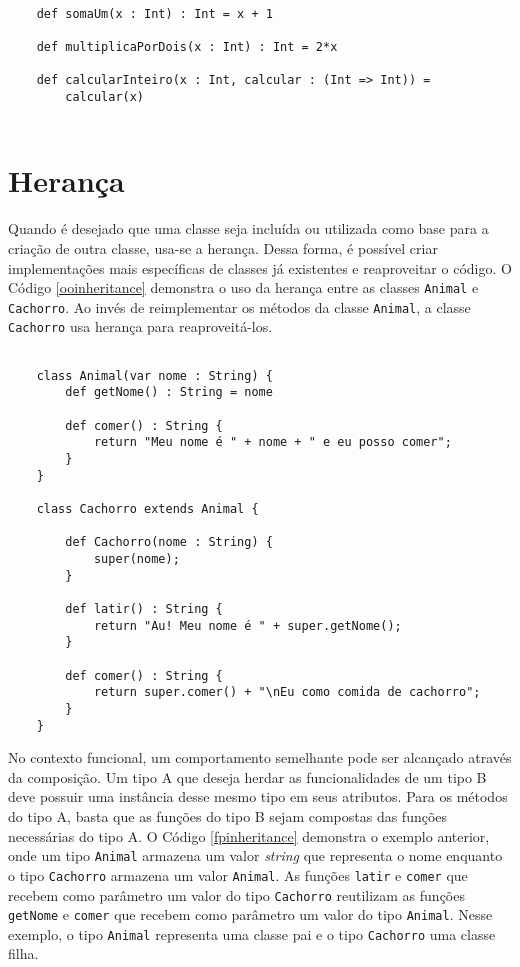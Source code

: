 \begin{lstlisting}[caption={Interfaces em Programação Funcional.},label=fpinterface1]
    
    def somaUm(x : Int) : Int = x + 1

    def multiplicaPorDois(x : Int) : Int = 2*x

    def calcularInteiro(x : Int, calcular : (Int => Int)) =
        calcular(x)
    
\end{lstlisting}



\section{Herança}

Quando é desejado que uma classe seja incluída ou 
utilizada como base para a criação de outra classe, 
usa-se a herança\cite{quarkoo}. Dessa forma, é 
possível criar implementações mais específicas 
de classes já existentes e reaproveitar o código. 
O Código \ref{ooinheritance} demonstra 
o uso da herança entre as classes \texttt{Animal} 
e \texttt{Cachorro}. 
Ao invés de reimplementar os métodos da classe 
\texttt{Animal}, a classe \texttt{Cachorro} usa herança 
para reaproveitá-los. 

\begin{lstlisting}[caption={Herança em Orientação a Objetos.},label=ooinheritance]
    
    class Animal(var nome : String) {
        def getNome() : String = nome
        
        def comer() : String {
            return "Meu nome é " + nome + " e eu posso comer";
        }
    }

    class Cachorro extends Animal {
        
        def Cachorro(nome : String) {
            super(nome);
        }

        def latir() : String {
            return "Au! Meu nome é " + super.getNome();
        }

        def comer() : String {
            return super.comer() + "\nEu como comida de cachorro";
        }
    }

\end{lstlisting}

No contexto funcional, um comportamento semelhante 
pode ser alcançado através da composição. Um tipo A 
que deseja herdar as funcionalidades de um tipo B 
deve possuir uma instância desse mesmo tipo em seus 
atributos. Para os métodos do tipo A, basta que as 
funções do tipo B sejam compostas das funções 
necessárias do tipo A. O Código \ref{fpinheritance} 
demonstra o exemplo anterior, onde um tipo \texttt{Animal} 
armazena um valor \textit{string} que representa o nome 
enquanto o tipo \texttt{Cachorro} armazena um valor \texttt{Animal}. 
As funções \texttt{latir} e \texttt{comer} que recebem como parâmetro 
um valor do tipo \texttt{Cachorro} reutilizam as funções \texttt{getNome} 
e \texttt{comer} que recebem como parâmetro um valor do tipo 
\texttt{Animal}. Nesse exemplo, o tipo \texttt{Animal} representa 
uma classe pai e o tipo \texttt{Cachorro} uma classe filha.

